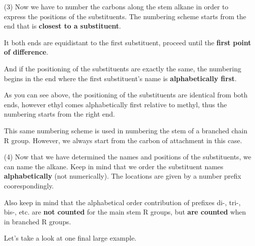 \documentclass[10pt]{article}
\begin{document}
  (3) Now we have to number the carbons along the stem alkane in order to express the positions of the substituents. The numbering scheme starts from the end that is \textbf{closest to a substituent}.
  
  
  It both ends are equidistant to the first substituent, proceed until the \textbf{first point of difference}.
  
  
  And if the positioning of the substituents are exactly the same, the numbering begins in the end where the first substituent's name is \textbf{alphabetically first}.


  As you can see above, the positioning of the substituents are identical from both ends, however ethyl comes alphabetically first relative to methyl, thus the numbering starts from the right end. 

  This same numbering scheme is used in numbering the stem of a branched chain R group. However, we always start from the carbon of attachment in this case. 


  (4) Now that we have determined the names and positions of the substituents, we can name the alkane. Keep in mind that we order the substituent names \textbf{alphabetically} (not numerically). The locations are given by a number prefix coorespondingly.


  Also keep in mind that the alphabetical order contribution of prefixes di-, tri-, bis-, etc. are \textbf{not counted} for the main stem R groups, but \textbf{are counted} when in branched R groups.


  Let's take a look at one final large example.

\end{document}
